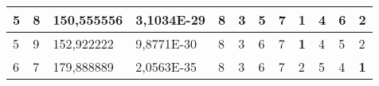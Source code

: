 \documentclass[conference]{IEEEtran}
\begin{document}
\begin{table*}[]
\begin{tabular}{|llll|llllllll|}
\multicolumn{1}{|l|}{5}                                                     & \multicolumn{1}{l|}{8}                                                        & \multicolumn{1}{l|}{150,555556}                                                   & 3,1034E-29                     & \multicolumn{1}{l|}{8}                                                  & \multicolumn{1}{l|}{3}                                                  & \multicolumn{1}{l|}{5}                                                  & \multicolumn{1}{l|}{7}                                                  & \multicolumn{1}{l|}{\textbf{1}}                                         & \multicolumn{1}{l|}{4}                                                  & \multicolumn{1}{l|}{6}                                                  & 2                          \\ \hline
\multicolumn{1}{|l|}{5}                                                     & \multicolumn{1}{l|}{9}                                                        & \multicolumn{1}{l|}{152,922222}                                                   & 9,8771E-30                     & \multicolumn{1}{l|}{8}                                                  & \multicolumn{1}{l|}{3}                                                  & \multicolumn{1}{l|}{6}                                                  & \multicolumn{1}{l|}{7}                                                  & \multicolumn{1}{l|}{\textbf{1}}                                         & \multicolumn{1}{l|}{4}                                                  & \multicolumn{1}{l|}{5}                                                  & 2                          \\ \hline
\multicolumn{1}{|l|}{6}                                                     & \multicolumn{1}{l|}{7}                                                        & \multicolumn{1}{l|}{179,888889}                                                   & 2,0563E-35                     & \multicolumn{1}{l|}{8}                                                  & \multicolumn{1}{l|}{3}                                                  & \multicolumn{1}{l|}{6}                                                  & \multicolumn{1}{l|}{7}                                                  & \multicolumn{1}{l|}{2}                                                  & \multicolumn{1}{l|}{5}                                                  & \multicolumn{1}{l|}{4}                                                  & \textbf{1}                 \\ \hline

\end{tabular}
\end{table*}
\end{document}
